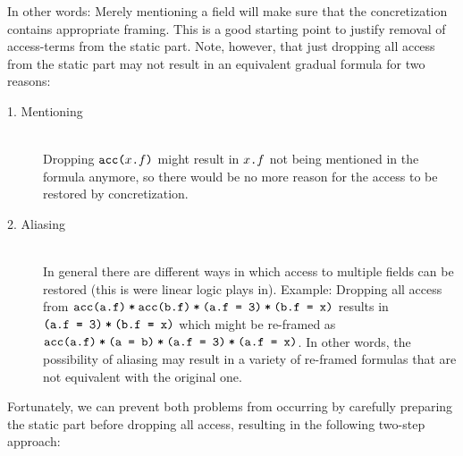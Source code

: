 \documentclass[11pt,a4paper]{article}
\begin{document}
In other words: Merely mentioning a field will make sure that the concretization contains appropriate framing.
This is a good starting point to justify removal of access-terms from the static part.
Note, however, that just dropping all access from the static part may not result in an equivalent gradual formula for two reasons:
\begin{description}
	\item[1. Mentioning]~\\
	Dropping $\texttt{acc($x$.$f$)}$ might result in $\texttt{$x$.$f$}$ not being mentioned in the formula anymore, so there would be no more reason for the access to be restored by concretization.
	
	\item[2. Aliasing]~\\
	In general there are different ways in which access to multiple fields can be restored (this is were linear logic plays in).
	Example: Dropping all access from $\texttt{\texttt{\texttt{acc(a.f)}\:*\:\texttt{acc(b.f)}}\:*\:\texttt{\texttt{(a.f = 3)}\:*\:\texttt{(b.f = x)}}}$
	results in
	$\texttt{\texttt{(a.f = 3)}\:*\:\texttt{(b.f = x)}}$
	which might be re-framed as
	$\texttt{\texttt{\texttt{acc(a.f)}\:*\:\texttt{(a = b)}}\:*\:\texttt{\texttt{(a.f = 3)}\:*\:\texttt{(a.f = x)}}}$.
	In other words, the possibility of aliasing may result in a variety of re-framed formulas that are not equivalent with the original one.
\end{description}

Fortunately, we can prevent both problems from occurring by carefully preparing the static part before dropping all access, resulting in the following two-step approach:
\end{document}
